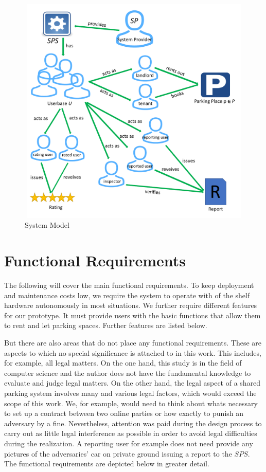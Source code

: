 \begin{figure}
	\centering
	\includegraphics[width=13cm,height=11cm]{logos/system-model-grafik.pdf}
	\caption{System Model}
	\label{img:system model}
\end{figure}

\section{Functional Requirements}
The following will cover the main functional requirements. To keep deployment and maintenance costs low, we require the system to operate with of the shelf hardware autonomously in most situations. We further require different features for our prototype. It must provide users with the basic functions that allow them to rent and let parking spaces. Further features are listed below. 

But there are also areas that do not place any functional requirements. These are aspects to which no special significance is attached to in this work. This includes, for example, all legal matters. On the one hand, this study is in the field of computer science and the author does not have the fundamental knowledge to evaluate and judge legal matters. On the other hand, the legal aspect of a shared parking system involves many and various legal factors, which would exceed the scope of this work. We, for example, would need to think about whats necessary to set up a contract between two online parties or how exactly to punish an adversary by a fine. Nevertheless, attention was paid during the design process to carry out as little legal interference as possible in order to avoid legal difficulties during the realization. A reporting user for example does not need provide any pictures of the adversaries' car on private ground issuing a report to the $SPS$. The functional requirements are depicted below in greater detail.

